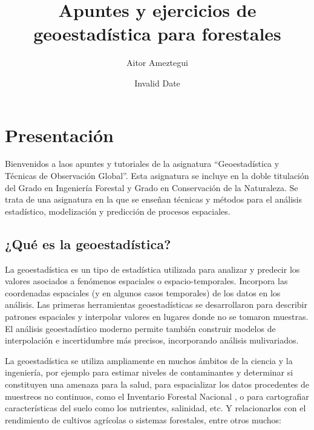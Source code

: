 \documentclass[
  letterpaper,
  DIV=11,
  numbers=noendperiod]{scrreprt}
\title{Apuntes y ejercicios de geoestadística para forestales}
\author{Aitor Ameztegui}
\date{Invalid Date}
\renewcommand*\contentsname{Table of contents}
\newcommand\contentsname{Table of contents}
\begin{document}
\maketitle
\ifdefined\Shaded\renewenvironment{Shaded}{\begin{tcolorbox}[enhanced, frame hidden, sharp corners, breakable, boxrule=0pt, borderline west={3pt}{0pt}{shadecolor}, interior hidden]}{\end{tcolorbox}}\fi

\renewcommand*\contentsname{Table of contents}
{
\hypersetup{linkcolor=}
\setcounter{tocdepth}{2}
\tableofcontents
}

\hypertarget{presentaciuxf3n}{%
\chapter*{Presentación}\label{presentaciuxf3n}}


Bienvenidos a laos apuntes y tutoriales de la asignatura
``Geoestadística y Técnicas de Observación Global''. Esta asignatura se
incluye en la doble titulación del Grado en Ingeniería Forestal y Grado
en Conservación de la Naturaleza. Se trata de una asignatura en la que
se enseñan técnicas y métodos para el análisis estadístico, modelización
y predicción de procesos espaciales.

\hypertarget{quuxe9-es-la-geoestaduxedstica}{%
\section*{¿Qué es la
geoestadística?}\label{quuxe9-es-la-geoestaduxedstica}}


La geoestadística es un tipo de estadística utilizada para analizar y
predecir los valores asociados a fenómenos espaciales o
espacio-temporales. Incorpora las coordenadas espaciales (y en algunos
casos temporales) de los datos en los análisis. Las primeras
herramientas geoestadísticas se desarrollaron para describir patrones
espaciales y interpolar valores en lugares donde no se tomaron muestras.
El análisis geoestadístico moderno permite también construir modelos de
interpolación e incertidumbre más precisos, incorporando análisis
mulivariados.

La geoestadística se utiliza ampliamente en muchos ámbitos de la ciencia
y la ingeniería, por ejemplo para estimar niveles de contaminantes y
determinar si constituyen una amenaza para la salud, para espacializar
los datos procedentes de muestreos no continuos, como el Inventario
Forestal Nacional , o para cartografiar características del suelo como
los nutrientes, salinidad, etc. Y relacionarlos con el rendimiento de
cultivos agrícolas o sistemas forestales, entre otros muchos:
\end{document}
